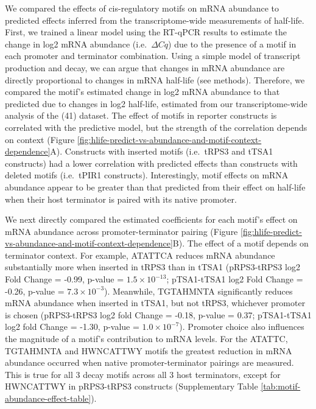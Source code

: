 \documentclass{SBCbookchapter}
\begin{document}
We compared the effects of cis-regulatory motifs on mRNA abundance to predicted effects inferred from the transcriptome-wide measurements of half-life.
First, we trained a linear model using the RT-qPCR results to estimate the change in log2 mRNA abundance (i.e.~\(\Delta Cq\)) due to the presence of a motif in each promoter and terminator combination.
Using a simple model of transcript production and decay, we can argue that changes in mRNA abundance are directly proportional to changes in mRNA half-life (see methods).
Therefore, we compared the motif's estimated change in log2 mRNA abundance to that predicted due to changes in log2 half-life, estimated from our transcriptome-wide analysis of the (41) dataset.
The effect of motifs in reporter constructs is correlated with the predictive model, but the strength of the correlation depends on context (Figure \ref{fig:hlife-predict-vs-abundance-and-motif-context-dependence}A).
Constructs with inserted motifs (i.e.~tRPS3 and tTSA1 constructs) had a lower correlation with predicted effects than constructs with deleted motifs (i.e.~tPIR1 constructs).
Interestingly, motif effects on mRNA abundance appear to be greater than that predicted from their effect on half-life when their host terminator is paired with its native promoter.

We next directly compared the estimated coefficients for each motif's effect on mRNA abundance across promoter-terminator pairing (Figure \ref{fig:hlife-predict-vs-abundance-and-motif-context-dependence}B).
The effect of a motif depends on terminator context.
For example, ATATTCA reduces mRNA abundance substantially more when inserted in tRPS3 than in tTSA1 (pRPS3-tRPS3 log2 Fold Change = -0.99, p-value = \(1.5 \times 10^{-13}\); pTSA1-tTSA1 log2 Fold Change = -0.26, p-value = \(7.3 \times10^{-3}\)).
Meanwhile, TGTAHMNTA significantly reduces mRNA abundance when inserted in tTSA1, but not tRPS3, whichever promoter is chosen (pRPS3-tRPS3 log2 fold Change = -0.18, p-value = 0.37; pTSA1-tTSA1 log2 fold Change = -1.30, p-value = \(1.0 \times10^{-7}\)).
Promoter choice also influences the magnitude of a motif's contribution to mRNA levels.
For the ATATTC, TGTAHMNTA and HWNCATTWY motifs the greatest reduction in mRNA abundance occurred when native promoter-terminator pairings are measured.
This is true for all 3 decay motifs across all 3 host terminators, except for HWNCATTWY in pRPS3-tRPS3 constructs (Supplementary Table \ref{tab:motif-abundance-effect-table}).
\end{document}
